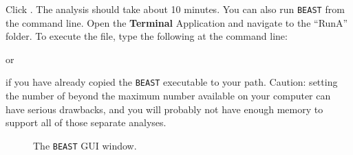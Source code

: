 {	    Click . The analysis should take about 10 minutes. 
	    You can also run \texttt{BEAST} from the command line. Open the {\bf Terminal} Application and navigate to the ``RunA'' folder. To execute the file, type the following at the command line:
	    
	    
	    or
	    
	    
	    if you have already copied the \texttt{BEAST} executable to your path. Caution: setting the number of  beyond the maximum number available on your computer can have serious drawbacks, and you will probably not have enough memory to support all of those separate analyses.
	  	
	\begin{figure}[htbp]
        \centering
        \caption{The \texttt{BEAST} GUI window.}
        \label{fig:beast}
    \end{figure}
    }


